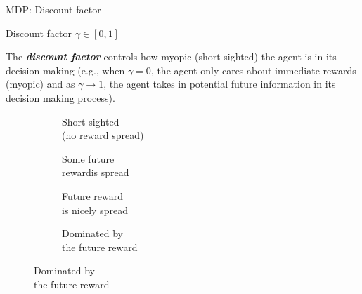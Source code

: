 \begin{frame}[fragile]{MDP: Discount factor}

{\scriptsize
\begin{definitionblock}{Discount factor $\gamma \in [0,1]$}

    \item The \textbf{\textit{discount factor}} controls how myopic (short-sighted) the agent is in its decision making (e.g., when $\gamma=0$, the agent only cares about immediate rewards (myopic) and as $\gamma \to 1$, the agent takes in potential future information in its decision making process).
\end{definitionblock}
}

\phantom{}

\captionsetup[sub]{font=tiny, justification=centering}

\begin{figure}
    \begin{subfigure}[b]{0.24\textwidth}
        \def\svgwidth{\columnwidth}
        
        \caption{Short-sighted\\(no reward spread)}
    \end{subfigure}
    \begin{subfigure}[b]{0.24\textwidth}
        \def\svgwidth{\columnwidth}
        
        \caption{Some future\\reward\footnotemark[1] is spread}
    \end{subfigure}
    \begin{subfigure}[b]{0.24\textwidth}
        \def\svgwidth{\columnwidth}
        
        \caption{Future reward\\is nicely spread}
    \end{subfigure}
    \begin{subfigure}[b]{0.24\textwidth}
        \def\svgwidth{\columnwidth}
        
        \caption{Dominated by\\the future reward}
    \end{subfigure}
\end{figure}


\end{frame}

